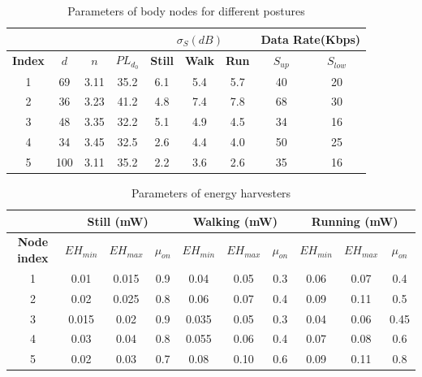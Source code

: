 \documentclass[journal,10pt]{IEEEtran}
\begin{document}
\begin{table} \scriptsize
\setlength{\abovecaptionskip}{-2pt}
\setlength{\belowcaptionskip}{0pt}
\caption{Parameters of body nodes for different postures}
\begin{center}
\begin{tabular}{|c|c|c|c|c|c|c|c|c|} \hline
\multicolumn{1}{|c}{} & \multicolumn{3}{c|}{}&\multicolumn{3}{c|}{${\sigma _{{S}}}{(dB)}$}& \multicolumn{2}{c|}{\scriptsize{\textbf{Data Rate}(Kbps)}}\\ \hline
 \textbf{Index} & \textbf{${d}$} & \textbf{${n}$}&\textbf{${PL_{d_{0}}}$}&\scriptsize{\textbf{Still}}  & \scriptsize{\textbf{Walk}}  & \scriptsize{\textbf{Run}}    & ${S_{up}}$ &${S_{low}}$ \\ \hline \hline
1   & 69 &3.11&35.2&6.1   &	5.4	&  5.7   &  40 & 20\\  \hline
2   & 36 &3.23&41.2& 4.8	&    7.4	&    7.8   & 68& 30\\  \hline
3   & 48 &3.35&32.2& 5.1	&     4.9&    4.5    & 34 & 16  \\  \hline
4   & 34 &3.45&32.5& 2.6	&    4.4	&    4.0    & 50 & 25\\  \hline
5   & 100 &3.11&35.2& 2.2	&    3.6	&    2.6   &  35 & 16\\  \hline
\end{tabular}
\end{center}
\label{tab:posNode}
\end{table}


\begin{table}  \scriptsize
\setlength{\abovecaptionskip}{-2pt}
\setlength{\belowcaptionskip}{0pt}
\caption{Parameters of energy harvesters}
\begin{center}
\begin{tabular}{|c|c|c|c|c|c|c|c|c|c|} \hline
&\multicolumn{3}{c|}{\textbf{Still (mW)}}&\multicolumn{3}{c|}{\textbf{Walking (mW)}}& \multicolumn{3}{c|}{\textbf{Running (mW)}}\\ \hline
\textbf{Node index}&$EH_{min}$&$EH_{max}$&${\mu _{on}}$&$EH_{min}$&$EH_{max}$&${\mu _{on}}$& $EH_{min}$&$EH_{max}$&${\mu _{on}}$\\ \hline 
1   &	 0.01 &0.015&0.9& 	 0.04 &	0.05	&  0.3    &  0.06 & 0.07 & 0.4\\  \hline
2   & 0.02 &0.025&0.8&  	0.06  &	0.07	&  0.4  	 &  0.09 & 0.11 & 0.5\\  \hline
3   & 0.015 &0.02&0.9&  	 0.035  &	0.05	&  0.3  	 &  0.04 & 0.06 & 0.45\\  \hline
4   & 0.03 &0.04&0.8&  	0.055  &	 0.06	&  0.4   	&  0.07 & 0.08 & 0.6\\  \hline
5   & 0.02 &0.03&0.7&  	0.08  &	0.10	&  0.6   	&  0.09 & 0.11 & 0.8\\  \hline
\end{tabular}
\end{center}
\label{tab:parEH}
\end{table}
\end{document}
